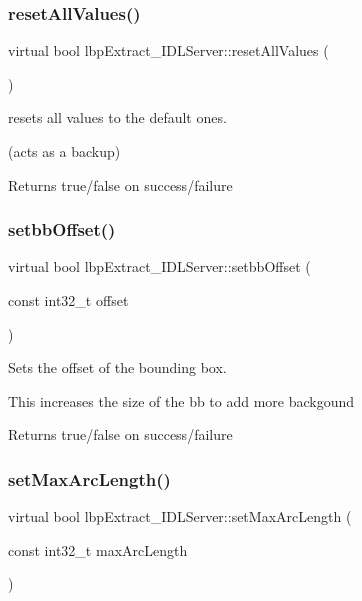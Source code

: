 \subsubsection{\texorpdfstring{reset\+All\+Values()}{resetAllValues()}}
{\footnotesize\ttfamily virtual bool lbp\+Extract\+\_\+\+I\+D\+L\+Server\+::reset\+All\+Values (\begin{DoxyParamCaption}{ }\end{DoxyParamCaption})\hspace{0.3cm}{\ttfamily [virtual]}}



resets all values to the default ones. 

(acts as a backup) \begin{DoxyReturn}{Returns}
true/false on success/failure 
\end{DoxyReturn}
\mbox{\label{classlbpExtract__IDLServer_aebf9bfaa7a16309244177c4b7b094e2a}} 
\subsubsection{\texorpdfstring{setbb\+Offset()}{setbbOffset()}}
{\footnotesize\ttfamily virtual bool lbp\+Extract\+\_\+\+I\+D\+L\+Server\+::setbb\+Offset (\begin{DoxyParamCaption}\item[{const int32\+\_\+t}]{offset }\end{DoxyParamCaption})\hspace{0.3cm}{\ttfamily [virtual]}}



Sets the offset of the bounding box. 

This increases the size of the bb to add more backgound \begin{DoxyReturn}{Returns}
true/false on success/failure 
\end{DoxyReturn}
\mbox{\label{classlbpExtract__IDLServer_abc379ba01952949df03f977c74884ade}} 
\subsubsection{\texorpdfstring{set\+Max\+Arc\+Length()}{setMaxArcLength()}}
{\footnotesize\ttfamily virtual bool lbp\+Extract\+\_\+\+I\+D\+L\+Server\+::set\+Max\+Arc\+Length (\begin{DoxyParamCaption}\item[{const int32\+\_\+t}]{max\+Arc\+Length }\end{DoxyParamCaption})\hspace{0.3cm}{\ttfamily [virtual]}}



